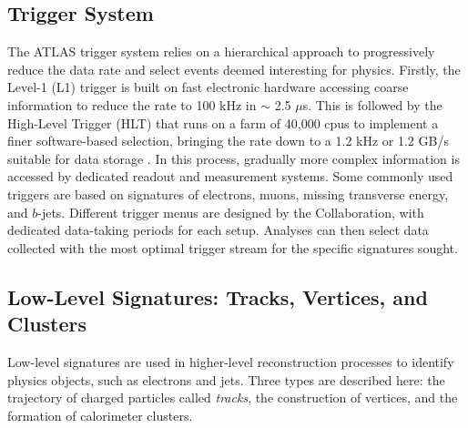 \subsection{Trigger System}\label{sub-sec-trigger}
The ATLAS trigger system relies on a hierarchical approach to progressively reduce the data rate and select events deemed interesting for physics. Firstly, the Level-1 (L1) trigger is built on fast electronic hardware accessing coarse information to reduce the rate to 100 kHz in $\sim$ 2.5 $\mu$s. This is followed by the High-Level Trigger (HLT) that runs on a farm of 40,000 \glspl{cpu} to implement a finer software-based selection, bringing the rate down to a 1.2 kHz or 1.2 GB/s suitable for data storage \cite{TriggerATLAScollaboration_2020}. In this process, gradually more complex information is accessed by dedicated readout and measurement systems. Some commonly used triggers are based on signatures of electrons, muons, missing transverse energy, and $b$-jets. Different trigger menus are designed by the Collaboration, with dedicated data-taking periods for each setup. Analyses can then select data collected with the most optimal trigger stream for the specific signatures sought. 

\subsection{Low-Level Signatures: Tracks, Vertices, and Clusters}\label{sec-atlas-lw}
Low-level signatures are used in higher-level reconstruction processes to identify physics objects, such as electrons and jets. Three types are described here: the trajectory of charged particles called \textit{tracks}, the construction of vertices, and the formation of calorimeter clusters. \\

